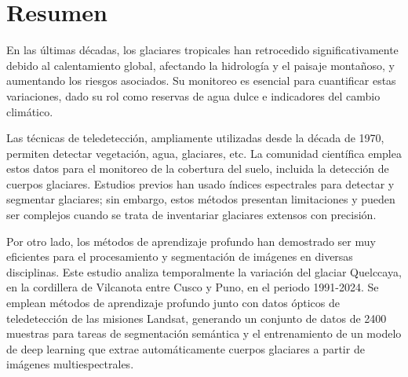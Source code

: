 \chapter*{Resumen}
\doublespacing
En las últimas décadas, los glaciares tropicales han retrocedido significativamente debido al calentamiento global, afectando la hidrología y el paisaje montañoso, y aumentando los riesgos asociados. Su monitoreo es esencial para cuantificar estas variaciones, dado su rol como reservas de agua dulce e indicadores del cambio climático.

Las técnicas de teledetección, ampliamente utilizadas desde la década de 1970, permiten detectar vegetación, agua,  glaciares, etc. La comunidad científica emplea estos datos para el monitoreo de la cobertura del suelo, incluida la detección de cuerpos glaciares. Estudios previos han usado índices espectrales para detectar y segmentar glaciares; sin embargo, estos métodos presentan limitaciones y pueden ser complejos cuando se trata de inventariar glaciares extensos con precisión.

Por otro lado, los métodos de aprendizaje profundo han demostrado ser muy eficientes para el procesamiento y segmentación de imágenes en diversas disciplinas. Este estudio analiza temporalmente la variación del glaciar Quelccaya, en la cordillera de Vilcanota entre Cusco y Puno, en el periodo 1991-2024. Se emplean métodos de aprendizaje profundo junto con datos ópticos de teledetección de las misiones Landsat, generando un conjunto de datos de 2400 muestras para tareas de segmentación semántica y el entrenamiento de un modelo de deep learning que extrae automáticamente cuerpos glaciares a partir de imágenes multiespectrales.

